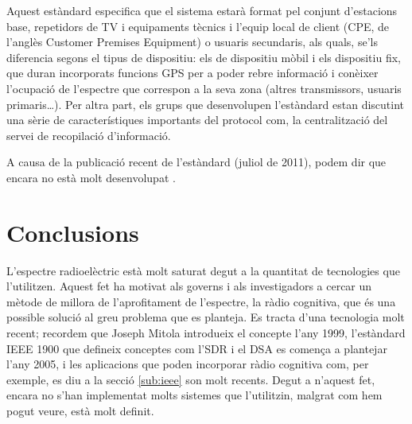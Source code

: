 \documentclass[10pt,journal,a4paper]{IEEEtran}
\begin{document}
Aquest estàndard especifica que el sistema estarà format pel conjunt d'estacions base, repetidors de TV i equipaments tècnics i l'equip local de client (CPE, de l'anglès Customer Premises Equipment) o usuaris secundaris, als quals, se'ls diferencia segons el tipus de dispositiu: els de dispositiu mòbil i els dispositiu fix, que duran incorporats funcions GPS per a poder rebre informació i conèixer l'ocupació de l'espectre que correspon a la seva zona (altres transmissors, usuaris primaris\dots). 
Per altra part, els grups que desenvolupen l'estàndard estan discutint una sèrie de característiques importants del protocol com, la centralització del servei de recopilació d'informació. 

A causa de la publicació recent  de l'estàndard (juliol de 2011), podem dir que encara no està molt desenvolupat \cite{wran_wiki}.

%

\section{Conclusions}
L'espectre radioelèctric  està molt saturat degut a la quantitat de tecnologies que l’utilitzen. Aquest fet ha motivat als governs i als investigadors a cercar un mètode de millora de l'aprofitament de l’espectre, la ràdio cognitiva, que és una possible solució al greu problema que es planteja.
Es tracta d’una tecnologia molt recent; recordem que Joseph Mitola introdueix el concepte l’any 1999, l’estàndard IEEE 1900 que defineix conceptes com l’SDR i el DSA es comença a plantejar  l’any 2005, i les aplicacions que poden incorporar ràdio cognitiva com, per exemple, es diu a la secció \ref{sub:ieee} son molt recents. Degut a n’aquest fet, encara no s’han implementat molts sistemes que l’utilitzin, malgrat com hem pogut veure, està molt definit.
\end{document}
